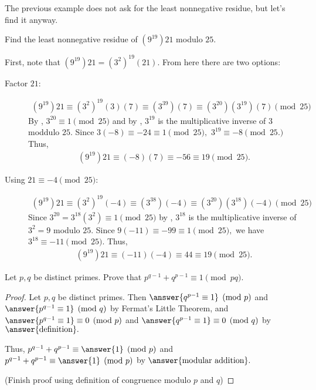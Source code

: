 \documentclass{ximera}
\begin{document}
The previous example does not ask for the least nonnegative residue, but let's find it anyway.

\begin{example}
  Find the least nonnegative residue of $(9^{19})21$ modulo $25$.

  First, note that $(9^{19})21=(3^2)^19(21)$. From here there are two options:

  \begin{description}
    \item[Factor $21$:]
      \begin{align*}
        (9^{19})21\equiv (3^2)^19(3)(7)
        \equiv (3^{39})(7)
        \equiv (3^{20})(3^{19})(7) \pmod{25}
      \end{align*}
      By , $3^{20}\equiv 1\pmod{25}$ and by , $3^{19}$ is the multiplicative inverse of $3$ moddulo $25.$ Since $3(-8)\equiv -24\equiv 1\pmod{25},$ $3^{19}\equiv -8\pmod{25.}$ Thus, 
      \begin{align*}
        (9^{19})21\equiv (-8)(7)\equiv -56\equiv 19 \pmod{25}.
      \end{align*}

    \item[Using $21\equiv -4\pmod{25}$:] 
      \begin{align*}
        (9^{19})21\equiv (3^2)^19(-4)
        \equiv (3^{38})(-4)
        \equiv (3^{20})(3^{18})(-4) \pmod{25}
      \end{align*}
      Since $3^{20}=3^{18}(3^2)\equiv 1\pmod{25}$ by , $3^{18}$ is the multiplicative inverse of $3^2=9$ modulo $25.$ Since $9(-11)\equiv -99\equiv 1\pmod{25},$ we have $3^{18}\equiv -11\pmod{25}.$ Thus, 
      \begin{align*}
        (9^{19})21\equiv (-11)(-4)\equiv 44 \equiv 19 \pmod{25}.
      \end{align*}
  \end{description}
  
\end{example}

\begin{br}\label{br:modpq}
  Let $p,q$ be distinct primes. Prove that $p^{q-1}+q^{p-1}\equiv 1 \pmod{pq}.$
 
 
  \begin{proof} Let $p,q$ be distinct primes. 
   Then $\answer{q^{p-1}\equiv 1}\pmod{p}$ and  $\answer{p^{q-1}\equiv 1}\pmod{q}$ by Fermat's Little Theorem, and $\answer{p^{q-1}\equiv 1}\equiv0\pmod{p}$ and  $\answer{q^{p-1}\equiv 1}\equiv 0\pmod{q}$ by $\answer{\textnormal{definition}}.$
   
   Thus, $p^{q-1}+q^{p-1}\equiv \answer{1} \pmod{p}$ and $p^{q-1}+q^{p-1}\equiv \answer{1} \pmod{p}$ by $\answer{\textnormal{modular addition}}.$

   (Finish proof using definition of congruence modulo $p$ and $q$)
  \end{proof}
\end{br}

\end{document}
